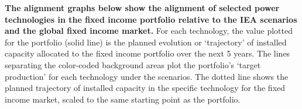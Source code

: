 \documentclass[10pt,table,a4]{article}\usepackage[]{graphicx}\usepackage[]{color}
\begin{document}
	\begin{multicols}{2}
		\textbf{The alignment graphs below show the alignment of selected power technologies in the fixed income portfolio relative to the IEA scenarios and the global fixed income market.}
		For each technology, the value plotted for the portfolio (solid line) is the planned evolution or `trajectory' of installed capacity allocated to the fixed income portfolio over the next 5 years. The lines separating the color-coded background areas plot the portfolio's `target production' for each technology under the scenarios. The dotted line shows the planned trajectory of installed capacity in the specific technology for the fixed income market, scaled to the same starting point as the portfolio.                    
		
	\end{multicols}	
	
	
	
\end{document}

